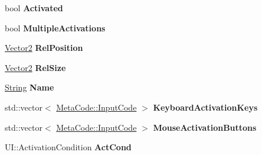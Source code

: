 \begin{DoxyCompactItemize}
\item 
\hypertarget{classphys_1_1UI_1_1Button_a7f4ee543e998a4bd369f05b531b1a04e}{
bool {\bfseries Activated}}
\label{d8/d88/classphys_1_1UI_1_1Button_a7f4ee543e998a4bd369f05b531b1a04e}

\item 
\hypertarget{classphys_1_1UI_1_1Button_af33ffe0a2d4c4e5344e810c313a06e6f}{
bool {\bfseries MultipleActivations}}
\label{d8/d88/classphys_1_1UI_1_1Button_af33ffe0a2d4c4e5344e810c313a06e6f}

\item 
\hypertarget{classphys_1_1UI_1_1Button_a981baa14d909cd6750553e3802545380}{
\hyperlink{classphys_1_1Vector2}{Vector2} {\bfseries RelPosition}}
\label{d8/d88/classphys_1_1UI_1_1Button_a981baa14d909cd6750553e3802545380}

\item 
\hypertarget{classphys_1_1UI_1_1Button_a413a4e4c3b815275051a881b7539a8f9}{
\hyperlink{classphys_1_1Vector2}{Vector2} {\bfseries RelSize}}
\label{d8/d88/classphys_1_1UI_1_1Button_a413a4e4c3b815275051a881b7539a8f9}

\item 
\hypertarget{classphys_1_1UI_1_1Button_ab3151f18855c8de2ffb80975f04041c1}{
\hyperlink{namespacephys_aa03900411993de7fbfec4789bc1d392e}{String} {\bfseries Name}}
\label{d8/d88/classphys_1_1UI_1_1Button_ab3151f18855c8de2ffb80975f04041c1}

\item 
\hypertarget{classphys_1_1UI_1_1Button_ae5df151f265267d289adc904bfff5833}{
std::vector$<$ \hyperlink{classphys_1_1MetaCode_a3e501cbb5bf0f6f1fdb7211465bda8d8}{MetaCode::InputCode} $>$ {\bfseries KeyboardActivationKeys}}
\label{d8/d88/classphys_1_1UI_1_1Button_ae5df151f265267d289adc904bfff5833}

\item 
\hypertarget{classphys_1_1UI_1_1Button_af0ec4864f55387a715cc4cccd76676c8}{
std::vector$<$ \hyperlink{classphys_1_1MetaCode_a3e501cbb5bf0f6f1fdb7211465bda8d8}{MetaCode::InputCode} $>$ {\bfseries MouseActivationButtons}}
\label{d8/d88/classphys_1_1UI_1_1Button_af0ec4864f55387a715cc4cccd76676c8}

\item 
\hypertarget{classphys_1_1UI_1_1Button_a659d498ea38854038a3ed487b24bd331}{
UI::ActivationCondition {\bfseries ActCond}}
\label{d8/d88/classphys_1_1UI_1_1Button_a659d498ea38854038a3ed487b24bd331}

\end{DoxyCompactItemize}



